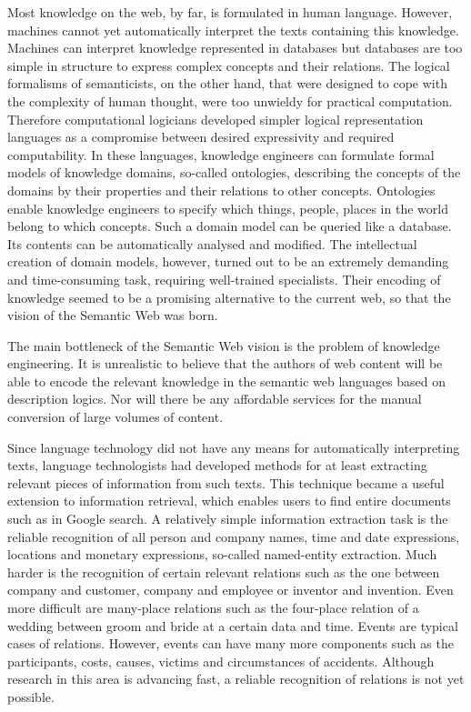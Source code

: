 \documentclass[10pt, plain]{../../metanetpaper}
\begin{document}
\begin{multicols}{2}
Most knowledge on the web, by far, is formulated in human language. However, machines cannot yet automatically interpret the texts containing this knowledge. Machines can interpret knowledge represented in databases but databases are too simple in structure to express complex concepts and their relations. The logical formalisms of semanticists, on the other hand, that were designed to cope with the complexity of human thought, were too unwieldy for practical computation. Therefore computational logicians developed simpler logical representation languages as a compromise between desired expressivity and required computability. In these languages, knowledge engineers can formulate formal models of knowledge domains, so-called ontologies,  describing the concepts of the domains by their properties and their relations to other concepts. Ontologies enable knowledge engineers to specify which things, people, places in the world belong to which concepts. Such a domain model can be queried like a database. Its contents can be automatically analysed and modified. The intellectual creation of domain models, however, turned out to be an extremely demanding and time-consuming task, requiring well-trained specialists. Their encoding of knowledge seemed to be a promising alternative to the current web, so that the vision of the Semantic Web was born. 
 
The main bottleneck of the Semantic Web vision is the problem of knowledge engineering. It is unrealistic to believe that the authors of web content will be able to encode the relevant knowledge in the semantic web languages based on description logics. Nor will there be any affordable services for the manual conversion of large volumes of content.
 
Since language technology did not have any means for automatically interpreting texts, language technologists had developed methods for at least extracting relevant pieces of information from such texts. This technique became a useful extension to information retrieval, which enables users to find entire documents such as in Google search. A relatively simple information extraction task is the reliable recognition of all person and company names, time and date expressions, locations and monetary expressions, so-called named-entity extraction. Much harder is the recognition of certain relevant relations such as the one between company and customer, company and employee or inventor and invention. Even more difficult are many-place relations such as the four-place relation of a wedding between groom and bride at a certain data and time. Events are typical cases of relations. However, events can have many more components such as the participants, costs, causes, victims and circumstances of accidents. Although research in this area is advancing fast, a reliable recognition of relations is not yet possible.
 

\end{multicols}
\end{document}
